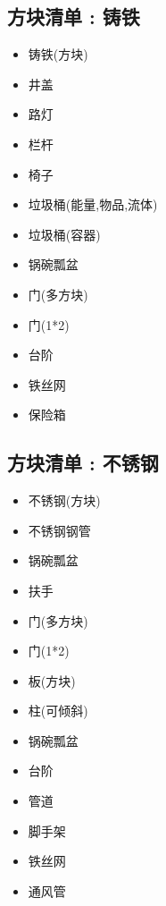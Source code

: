 {  \subsection{方块清单 : 铸铁}{
      \begin{itemize}
          \item 铸铁(方块)
          \item 井盖
          \item 路灯
          \item 栏杆
          \item 椅子
          \item 垃圾桶(能量,物品,流体)
          \item 垃圾桶(容器)
          \item 锅碗瓢盆
          \item 门(多方块)
          \item 门(1*2)
          \item 台阶
          \item 铁丝网
          \item 保险箱
      \end{itemize}
  }

  \subsection{方块清单 : 不锈钢}{
      \begin{itemize}
          \item 不锈钢(方块)
          \item 不锈钢钢管
          \item 锅碗瓢盆
          \item 扶手
          \item 门(多方块)
          \item 门(1*2)
          \item 板(方块)
          \item 柱(可倾斜)
          \item 锅碗瓢盆
          \item 台阶
          \item 管道
          \item 脚手架
          \item 铁丝网
          \item 通风管
      \end{itemize}
  }

}
